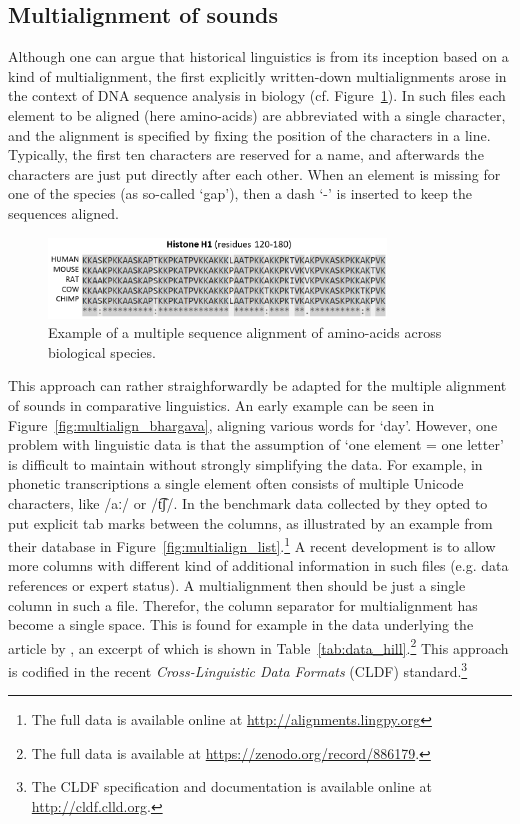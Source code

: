 \documentclass[11pt]{article}
\begin{document}
\subsection{Multialignment of sounds}

Although one can argue that historical linguistics is from its inception based on a kind of multialignment, the first explicitly written-down multialignments arose in the context of DNA sequence analysis in biology (cf. Figure~\ref{fig:aminoacids}). In such files each element to be aligned (here amino-acids) are abbreviated with a single character, and the alignment is specified by fixing the position of the characters in a line. Typically, the first ten characters are reserved for a name, and afterwards the characters are just put directly after each other. When an element is missing for one of the species (as so-called `gap'), then a dash `-' is inserted to keep the sequences aligned.

\begin{figure}[htbp] 
	\centering
	\includegraphics[width=0.8\textwidth]{images/Histone_Alignment.png}
 	\caption{Example of a multiple sequence alignment of amino-acids across biological species.\protect\footnotemark}
	\label{fig:aminoacids}
\end{figure}

This approach can rather straighforwardly be adapted for the multiple alignment of sounds in comparative linguistics. An early example can be seen in Figure~\ref{fig:multialign_bhargava}, aligning various words for `day'. However, one problem with linguistic data is that the assumption of `one element = one letter' is difficult to maintain without strongly simplifying the data. For example, in phonetic transcriptions a single element often consists of multiple Unicode characters, like /aː/ or /t͡ʃ/. In the benchmark data collected by \textcite{list2014benchmark} they opted to put explicit tab marks between the columns, as illustrated by an example from their database in Figure~\ref{fig:multialign_list}.\footnote{The full data is available online at \url{http://alignments.lingpy.org}} A recent development is to allow more columns with different kind of additional information in such files (e.g. data references or expert status). A multialignment then should be just a single column in such a file. Therefor, the column separator for multialignment has become a single space. This is found for example in the data underlying the article by \textcite{hill2017}, an excerpt of which is shown in Table~\ref{tab:data_hill}.\footnote{The full data is available at \url{https://zenodo.org/record/886179}.} This approach is codified in the recent \textit{Cross-Linguistic Data Formats} (CLDF) standard.\footnote{The CLDF specification and documentation is available online at \url{http://cldf.clld.org}.}
\end{document}
